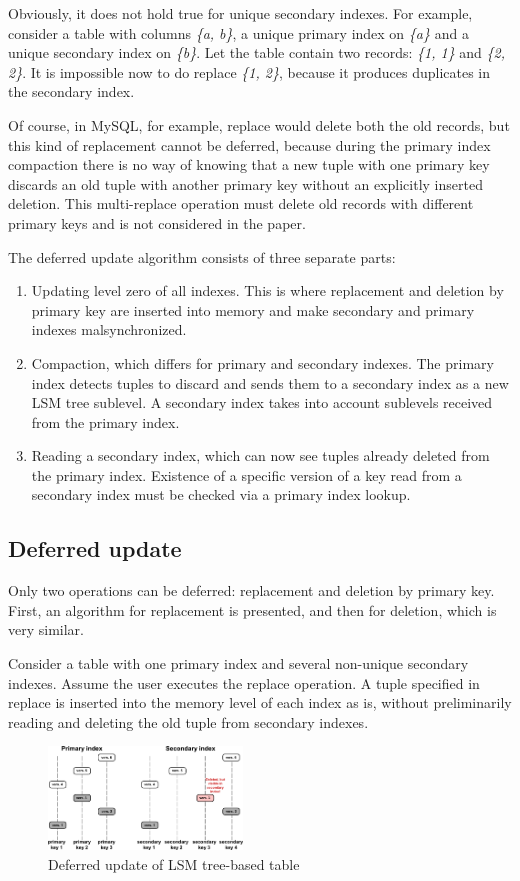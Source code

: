 \documentclass{vldb}
\begin{document}
Obviously, it does not hold true for unique secondary indexes. For example,
consider a table with columns \textit{\{a, b\}}, a unique primary index on
\textit{\{a\}} and a unique secondary index on \textit{\{b\}}. Let the table contain
two records: \textit{\{1, 1\}} and \textit{\{2, 2\}}. It is impossible now to do
replace \textit{\{1, 2\}}, because it produces duplicates in the secondary index.

Of course, in MySQL, for example, replace would delete both the old records, but
this kind of replacement cannot be deferred, because during the primary index
compaction there is no way of knowing that a new tuple with one primary key
discards an old tuple with another primary key without an explicitly inserted
deletion. This multi-replace operation must delete old records with different
primary keys and is not considered in the paper.

The deferred update algorithm consists of three separate parts:
\begin{enumerate}
\item Updating level zero of all indexes. This is where replacement and deletion by
primary key are inserted into memory and make secondary and primary indexes
malsynchronized.
\item Compaction, which differs for primary and secondary indexes. The primary
index detects tuples to discard and sends them to a secondary index as a new
LSM tree sublevel. A secondary index takes into account sublevels received from
the primary index.
\item Reading a secondary index, which can now see tuples already deleted from the
primary index. Existence of a specific version of a key read from a secondary
index must be checked via a primary index lookup.
\end{enumerate}

\subsection{Deferred update}
Only two operations can be deferred: replacement and deletion by primary key.
First, an algorithm for replacement is presented, and then for deletion, which is
very similar.

Consider a table with one primary index and several non-unique secondary indexes.
Assume the user executes the replace operation. A tuple specified in replace is inserted
into the memory level of each index as is, without preliminarily reading and deleting
the old tuple from secondary indexes.
\begin{figure}
\centering
\includegraphics[width=0.46\textwidth]{table_after_deferred_update}
\caption{Deferred update of LSM tree-based table}
\label{fig:table_after_deferred_update}
\end{figure}
\end{document}
